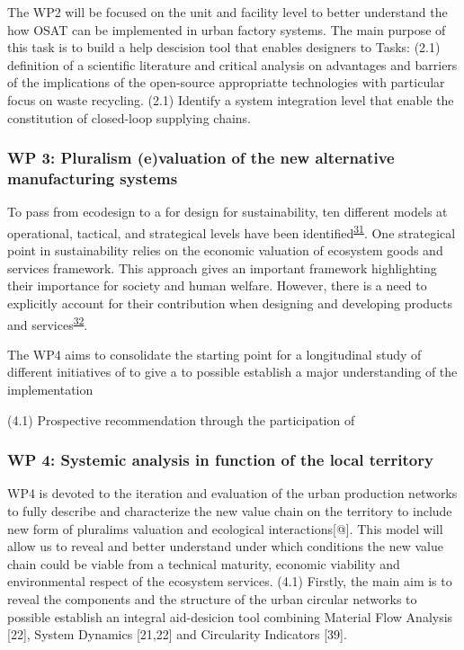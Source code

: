 \documentclass[
  11pt,
  a4paperpaper,
  onecolumn]{article}
\begin{document}
The WP2 will be focused on the unit and facility level to better
understand the how OSAT can be implemented in urban factory systems. The
main purpose of this task is to build a help descision tool that enables
designers to Tasks: (2.1) definition of a scientific literature and
critical analysis on advantages and barriers of the implications of the
open-source appropriatte technologies with particular focus on waste
recycling. (2.1) Identify a system integration level that enable the
constitution of closed-loop supplying chains.

\hypertarget{wp-3-pluralism-evaluation-of-the-new-alternative-manufacturing-systems}{%
\subsubsection{WP 3: Pluralism (e)valuation of the new alternative
manufacturing
systems}\label{wp-3-pluralism-evaluation-of-the-new-alternative-manufacturing-systems}}

To pass from ecodesign to a for design for sustainability, ten different
models at operational, tactical, and strategical levels have been
identified\textsuperscript{\protect\hyperlink{ref-SousaRocha2019}{31}}.
One strategical point in sustainability relies on the economic valuation
of ecosystem goods and services framework. This approach gives an
important framework highlighting their importance for society and human
welfare. However, there is a need to explicitly account for their
contribution when designing and developing products and
services\textsuperscript{\protect\hyperlink{ref-Diwekar2021}{32}}.

The WP4 aims to consolidate the starting point for a longitudinal study
of different initiatives of to give a to possible establish a major
understanding of the implementation

(4.1) Prospective recommendation through the participation of

\hypertarget{wp-4-systemic-analysis-in-function-of-the-local-territory}{%
\subsubsection{WP 4: Systemic analysis in function of the local
territory}\label{wp-4-systemic-analysis-in-function-of-the-local-territory}}

WP4 is devoted to the iteration and evaluation of the urban production
networks to fully describe and characterize the new value chain on the
territory to include new form of pluralims valuation and ecological
interactions{[}@{]}. This model will allow us to reveal and better
understand under which conditions the new value chain could be viable
from a technical maturity, economic viability and environmental respect
of the ecosystem services. (4.1) Firstly, the main aim is to reveal the
components and the structure of the urban circular networks to possible
establish an integral aid-desicion tool combining Material Flow Analysis
{[}22{]}, System Dynamics {[}21,22{]} and Circularity Indicators
{[}39{]}.
\end{document}
